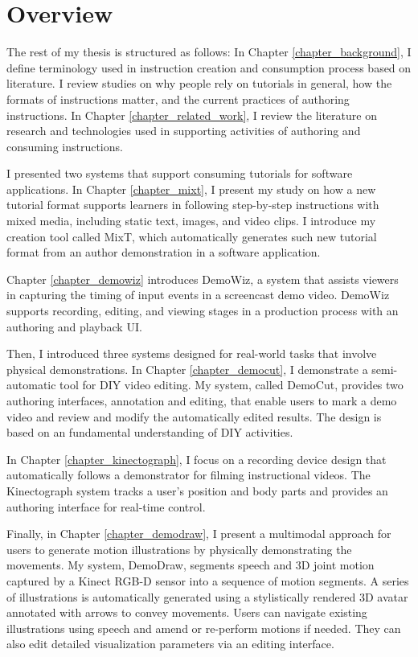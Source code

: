 
\section{Overview}

The rest of my thesis is structured as follows:
%
In Chapter \ref{chapter_background}, I define terminology used in instruction creation and consumption process based on literature. I review studies on why people rely on tutorials in general, how the formats of instructions matter, and the current practices of authoring instructions.
%
In Chapter \ref{chapter_related_work}, I review the literature on research and technologies used in supporting activities of authoring and consuming instructions.

I presented two systems that support consuming tutorials for software applications.
In Chapter \ref{chapter_mixt}, I present my study on how a new tutorial format supports learners in following step-by-step instructions with mixed media, including static text, images, and video clips. I introduce my creation tool called MixT, which automatically generates such new tutorial format from an author demonstration in a software application.

Chapter \ref{chapter_demowiz} introduces DemoWiz, a system that assists viewers in capturing the timing of input events in a screencast demo video. DemoWiz supports recording, editing, and viewing stages in a production process with an authoring and playback UI.

Then, I introduced three systems designed for real-world tasks that involve physical demonstrations.
In Chapter \ref{chapter_democut}, I demonstrate a semi-automatic tool for DIY video editing. My system, called DemoCut, provides two authoring interfaces, annotation and editing, that enable users to mark a demo video and review and modify the automatically edited results. The design is based on an fundamental understanding of DIY activities.

In Chapter \ref{chapter_kinectograph}, I focus on a recording device design that automatically follows a demonstrator for filming instructional videos. The Kinectograph system tracks a user's position and body parts and provides an authoring interface for real-time control.

Finally, in Chapter \ref{chapter_demodraw}, I present a multimodal approach for users to generate motion illustrations by physically demonstrating the movements. My system, DemoDraw, segments speech and 3D joint motion captured by a Kinect RGB-D sensor into a sequence of motion segments. A series of illustrations is automatically generated using a stylistically rendered 3D avatar annotated with arrows to convey movements. Users can navigate existing illustrations using speech and amend or re-perform motions if needed. They can also edit detailed visualization parameters via an editing interface.

